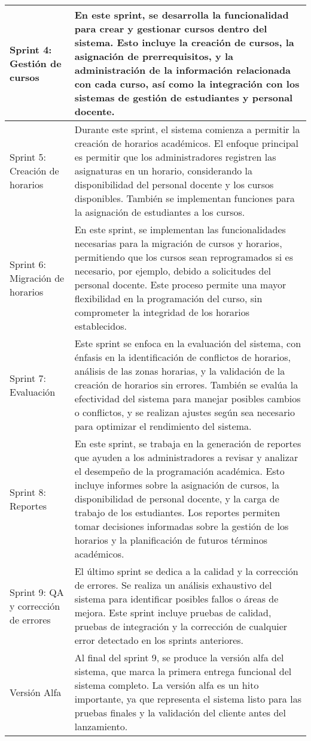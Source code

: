 \begin{longtable}{p{3in}|p{3in}}
Sprint 4: Gestión de cursos & 
En este sprint, se desarrolla la funcionalidad para crear y gestionar cursos dentro del sistema. Esto incluye la creación de cursos, la asignación de prerrequisitos, y la administración de la información relacionada con cada curso, así como la integración con los sistemas de gestión de estudiantes y personal docente. \\
\hline

Sprint 5: Creación de horarios & 
Durante este sprint, el sistema comienza a permitir la creación de horarios académicos. El enfoque principal es permitir que los administradores registren las asignaturas en un horario, considerando la disponibilidad del personal docente y los cursos disponibles. También se implementan funciones para la asignación de estudiantes a los cursos. \\
\hline

Sprint 6: Migración de horarios & 
En este sprint, se implementan las funcionalidades necesarias para la migración de cursos y horarios, permitiendo que los cursos sean reprogramados si es necesario, por ejemplo, debido a solicitudes del personal docente. Este proceso permite una mayor flexibilidad en la programación del curso, sin comprometer la integridad de los horarios establecidos. \\
\hline

Sprint 7: Evaluación & 
Este sprint se enfoca en la evaluación del sistema, con énfasis en la identificación de conflictos de horarios, análisis de las zonas horarias, y la validación de la creación de horarios sin errores. También se evalúa la efectividad del sistema para manejar posibles cambios o conflictos, y se realizan ajustes según sea necesario para optimizar el rendimiento del sistema. \\
\hline

Sprint 8: Reportes & 
En este sprint, se trabaja en la generación de reportes que ayuden a los administradores a revisar y analizar el desempeño de la programación académica. Esto incluye informes sobre la asignación de cursos, la disponibilidad de personal docente, y la carga de trabajo de los estudiantes. Los reportes permiten tomar decisiones informadas sobre la gestión de los horarios y la planificación de futuros términos académicos. \\
\hline

Sprint 9: QA y corrección de errores & 
El último sprint se dedica a la calidad y la corrección de errores. Se realiza un análisis exhaustivo del sistema para identificar posibles fallos o áreas de mejora. Este sprint incluye pruebas de calidad, pruebas de integración y la corrección de cualquier error detectado en los sprints anteriores. \\
\hline

Versión Alfa & 
Al final del sprint 9, se produce la versión alfa del sistema, que marca la primera entrega funcional del sistema completo. La versión alfa es un hito importante, ya que representa el sistema listo para las pruebas finales y la validación del cliente antes del lanzamiento. \\
\hline

\end{longtable}
